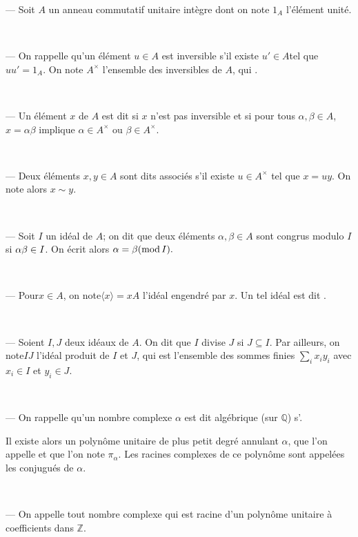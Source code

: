--- Soit $A$ un anneau commutatif unitaire int{\`e}gre dont on note $1_A$
l'{\'e}l{\'e}ment unit{\'e}.

\

--- On rappelle qu'un {\'e}l{\'e}ment $u \in A$ est inversible s'il existe
$u' \in A$tel que $u u' = 1_A .$ On note $A^{\times}$ l'ensemble des
inversibles de $A$, qui .

\

--- Un {\'e}l{\'e}ment $x$ de $A$ est dit  si $x$
n'est pas inversible et si pour tous $\alpha, \beta \in A$, $x = \alpha \beta$
implique $\alpha \in A^{\times}$ ou $\beta \in A^{\times}$.

\

--- Deux {\'e}l{\'e}ments $x, y \in A$ sont dits associ{\'e}s s'il existe $u
\in A^{\times}$ tel que $x = u y$. On note alors $x \sim y$.

\

--- Soit $I$ un id{\'e}al de $A$; on dit que deux {\'e}l{\'e}ments $\alpha,
\beta \in A$ sont congrus modulo $I$si $\alpha \nonconverted{minus} \beta \in
I$. On {\'e}crit alors $\alpha = \beta (\tmop{mod} I) .$

\

--- Pour$x \in A$, on note$ \langle x \rangle = x A$ l'id{\'e}al engendr{\'e}
par $x$. Un tel id{\'e}al est dit .

\

--- Soient $I, J$ deux id{\'e}aux de $A$. On dit que $I$ divise $J$ si $J
\subseteq I$. Par ailleurs, on note$I J$ l'id{\'e}al produit de $I$ et $J$,
qui est l'ensemble des sommes finies $\underset{i}{\sum} x_i y_i$ avec $x_i
\in I$ et $y_i \in J$.

\

--- On rappelle qu'un nombre complexe $\alpha$ est dit alg{\'e}brique (sur
$\mathbb{Q}$) s'.

Il existe alors un polyn{\^o}me unitaire de plus petit degr{\'e} annulant
$\alpha$, que l'on appelle  et que
l'on note $\pi_{\alpha}$. Les racines complexes de ce polyn{\^o}me sont
appel{\'e}es les conjugu{\'e}s de $\alpha$.

\

--- On appelle  tout nombre complexe qui est
racine d'un polyn{\^o}me unitaire {\`a} coefficients dans $\mathbb{Z}$.

